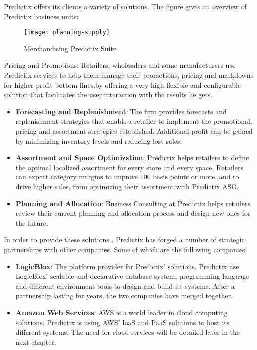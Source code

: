 Predictix offers its clients a variety of solutions. The figure gives an
overview of Predictix business units:

\begin{figure}[h]
  \center
  \texttt{[image: planning-supply]}
\caption{Merchandising Predictix Suite}
\label{fig:planning-supply}
\end{figure}

Pricing and Promotions: Retailers, wholesalers and some manufacturers use
Predictix services to help them manage their promotions, pricing and markdowns
for higher profit bottom lines,by offering a very high flexible and
configurable solution that facilitates the user interaction with the results he
gets.

\begin{itemize}
\item{\textbf{Forecasting  and Replenishment}: The firm provides forecasts and
    replenishment strategies that enable a retailer to implement the
    promotional, pricing and assortment strategies established. Additional
    profit can be gained by minimizing inventory levels and reducing lost
    sales.}

\item{\textbf{Assortment and Space Optimization}: Predictix helps retailers to
    define the optimal localized assortment for every store and every space.
    Retailers can expect category margins to improve 100 basis points or more,
    and to drive higher sales, from optimizing their assortment with Predictix
    ASO.}
\item{\textbf{Planning and  Allocation}: Business Consulting at Predictix helps
    retailers review their current planning and allocation process and design
    new ones for the future.}
\end{itemize}

\noindent In order to provide these solutions , Predictix has forged a number of
strategic partnerships with other companies. Some of which are the following
companies:

\begin{itemize}
  \item{\textbf{LogicBlox}: The platform provider for Predictix' solutions. Predictix use
LogicBlox' scalable and declarative database system, programming language and
different environment tools to design and build  its systems. After a
partnership lasting for years, the two companies have merged together.}

\item{\textbf{Amazon Web Services}: AWS is a world leader in cloud computing
solutions. Predictix is using AWS' IaaS and PaaS solutions to host its different
systems. The need for cloud services will be detailed later in the next chapter.}
\end{itemize}


